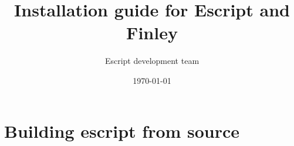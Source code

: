 \documentclass{manual}
\title{Installation guide for Escript and Finley}
\author{Escript development team}
\date{\today}
\begin{document}
\maketitle
\tableofcontents




\chapter{Building escript from source}
\label{chap:essrc}
 
\end{document}
